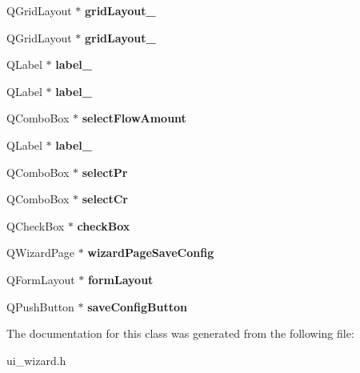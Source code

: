 \begin{DoxyCompactItemize}
\item 
\hypertarget{class_ui___wizard_a51d082e69bff333e80bbfeb37a52b37a}{}Q\+Grid\+Layout $\ast$ {\bfseries grid\+Layout\+\_}\label{class_ui___wizard_a51d082e69bff333e80bbfeb37a52b37a}

\item 
\hypertarget{class_ui___wizard_a927647b5add8b6c1b79f11b4e1c59936}{}Q\+Grid\+Layout $\ast$ {\bfseries grid\+Layout\+\_}\label{class_ui___wizard_a927647b5add8b6c1b79f11b4e1c59936}

\item 
\hypertarget{class_ui___wizard_a56e32ea802bb188b9d034f384a4daaaa}{}Q\+Label $\ast$ {\bfseries label\+\_}\label{class_ui___wizard_a56e32ea802bb188b9d034f384a4daaaa}

\item 
\hypertarget{class_ui___wizard_ae9e58c61c868d1a26b5d4e116479780c}{}Q\+Label $\ast$ {\bfseries label\+\_}\label{class_ui___wizard_ae9e58c61c868d1a26b5d4e116479780c}

\item 
\hypertarget{class_ui___wizard_ac777c566289cbf3f5c6fbbfb95afd488}{}Q\+Combo\+Box $\ast$ {\bfseries select\+Flow\+Amount}\label{class_ui___wizard_ac777c566289cbf3f5c6fbbfb95afd488}

\item 
\hypertarget{class_ui___wizard_ab4aa5ed390bb7487ce3eabeee821e324}{}Q\+Label $\ast$ {\bfseries label\+\_}\label{class_ui___wizard_ab4aa5ed390bb7487ce3eabeee821e324}

\item 
\hypertarget{class_ui___wizard_a0ca027cde31ee5bd472eb56d5d301bbf}{}Q\+Combo\+Box $\ast$ {\bfseries select\+Pr}\label{class_ui___wizard_a0ca027cde31ee5bd472eb56d5d301bbf}

\item 
\hypertarget{class_ui___wizard_a237f8604727f7721dc8d51f089fd8d1a}{}Q\+Combo\+Box $\ast$ {\bfseries select\+Cr}\label{class_ui___wizard_a237f8604727f7721dc8d51f089fd8d1a}

\item 
\hypertarget{class_ui___wizard_aa156e1350b0158969c4acfc7fe0d0d63}{}Q\+Check\+Box $\ast$ {\bfseries check\+Box}\label{class_ui___wizard_aa156e1350b0158969c4acfc7fe0d0d63}

\item 
\hypertarget{class_ui___wizard_a569b85ea802d49f3becc1839f54c40b3}{}Q\+Wizard\+Page $\ast$ {\bfseries wizard\+Page\+Save\+Config}\label{class_ui___wizard_a569b85ea802d49f3becc1839f54c40b3}

\item 
\hypertarget{class_ui___wizard_a651da1d973c283d2234516c1e462c7b9}{}Q\+Form\+Layout $\ast$ {\bfseries form\+Layout}\label{class_ui___wizard_a651da1d973c283d2234516c1e462c7b9}

\item 
\hypertarget{class_ui___wizard_a59bd83391de9734acec79797a473a58f}{}Q\+Push\+Button $\ast$ {\bfseries save\+Config\+Button}\label{class_ui___wizard_a59bd83391de9734acec79797a473a58f}

\end{DoxyCompactItemize}


The documentation for this class was generated from the following file\+:\begin{DoxyCompactItemize}
\item 
ui\+\_\+wizard.\+h\end{DoxyCompactItemize}
